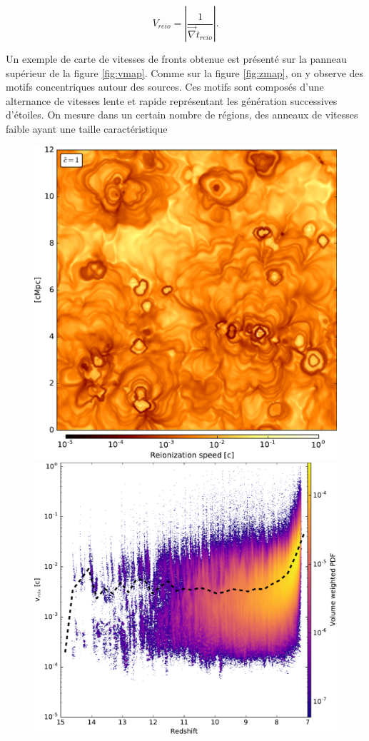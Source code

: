 \begin{equation}
V_{reio}  = \left | \frac{1}{ \vec{\nabla} t_{reio}} \right| .
\end{equation}

Un exemple de carte de vitesses de fronts obtenue est présenté sur la panneau supérieur de la figure \ref{fig:vmap}.
Comme sur la figure \ref{fig:zmap}, on y observe des motifs concentriques autour des sources.
Ces motifs sont composés d'une alternance de vitesses lente et rapide représentant les génération successives d'étoiles.
On mesure dans un certain nombre de régions, des anneaux de vitesses faible ayant une taille caractéristique

\begin{figure}
        \includegraphics[height=.45\textheight]{img/04_mapreio/map_v_c1.pdf} 
		\includegraphics[height=.45\textheight]{img/04_mapreio/speedreio_z.pdf} 

\end{figure}
